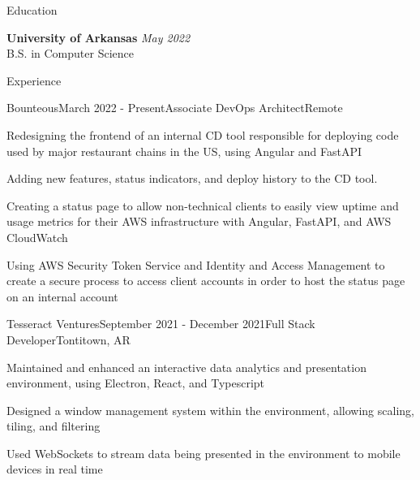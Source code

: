 \documentclass[
	11pt, %
]{resume} %
\begin{document}

\begin{rSection}{Education}
	
	\textbf{University of Arkansas} \hfill \textit{May 2022} \\ 
	B.S. in Computer Science

\end{rSection}


\begin{rSection}{Experience}

	\begin{rSubsection}{Bounteous}{March 2022 - Present}{Associate DevOps Architect}{Remote}
		\item Redesigning the frontend of an internal CD tool responsible for deploying code used by major restaurant chains in the US, using Angular and FastAPI
		\item Adding new features, status indicators, and deploy history to the CD tool.
		\item Creating a status page to allow non-technical clients to easily view uptime and usage metrics for their AWS infrastructure with Angular, FastAPI, and AWS CloudWatch
		\item Using AWS Security Token Service and Identity and Access Management to create a secure process to access client accounts in order to host the status page on an internal account
	\end{rSubsection}


	\begin{rSubsection}{Tesseract Ventures}{September 2021 - December 2021}{Full Stack Developer}{Tontitown, AR}
		\item Maintained and enhanced an interactive data analytics and presentation environment, using Electron, React, and Typescript
		\item Designed a window management system within the environment, allowing scaling, tiling, and filtering
		\item Used WebSockets to stream data being presented in the environment to mobile devices in real time
	\end{rSubsection}


\end{rSection}
\end{document}
